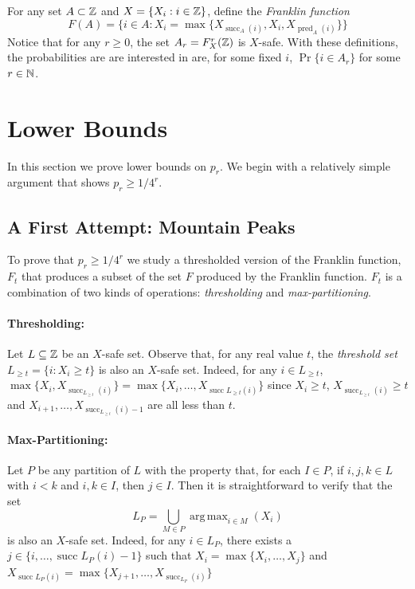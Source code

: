 \documentclass{patmorin}
\DeclareMathOperator*{\argmax}{arg\,max}
\DeclareMathOperator{\cw}{succ}
\DeclareMathOperator{\ccw}{pred}
\begin{document}
For any set $A\subset\mathbb{Z}$ and $X=\{X_i:i\in \mathbb{Z}\}$, define the
\emph{Franklin function}
\[
   F(A) = \{ i\in A : X_{i} = \max\{X_{\cw_A(i)},X_i,X_{\ccw_A(i)}\} \}
\]
Notice that for any $r\ge 0$, the set $A_r=F^r_X(\mathbb{Z})$ is $X$-safe.
With these definitions, the probabilities are are interested in are,
for some fixed $i$, $\Pr\{i\in A_r\}$ for some $r\in\mathbb{N}$.

\section{Lower Bounds}

In this section we prove lower bounds on $p_r$. We begin with a relatively simple argument that shows $p_r \ge 1/4^r$.  

\subsection{A First Attempt: Mountain Peaks}

To prove that $p_r \ge 1/4^r$ we study a
thresholded version of the Franklin function, $F_t$ that produces a
subset of the set $F$ produced by the Franklin function. $F_t$ is a
combination of two kinds of operations: \emph{thresholding} and \emph{max-partitioning}.

\paragraph{Thresholding:}
Let $L\subseteq\mathbb{Z}$ be an $X$-safe set.  Observe that, for any real
value $t$, the \emph{threshold set} $L_{\ge t}=\{i:X_i\ge t\}$ is also an
$X$-safe set. Indeed, for any $i\in L_{\ge t}$, $\max\{X_i,X_{\cw_{L_{\ge t}}(i)}\} = \max\{X_i,\ldots,X_{\cw{L_{\ge t}}(i)}\}$ since $X_i\ge t$, $X_{\cw_{L_{\ge t}}(i)}\ge t$ and $X_{i+1},\ldots,X_{\cw_{L_{\ge t}}(i)-1}$ are all less than $t$.

\paragraph{Max-Partitioning:}
Let $P$ be any partition of $L$ with the property that, for each $I\in
P$, if $i,j,k\in L$ with $i < k$ and $i,k\in I$, then $j\in I$. Then it
is straightforward to verify that the set
\[
     L_{P} = \bigcup_{M\in P} \argmax_{i\in M}(X_i)
\]
is also an $X$-safe set. Indeed, for any $i\in L_{P}$, there exists a $j\in\{i,\ldots,\cw{L_P}(i)-1\}$ such that $X_i=\max\{X_i,\ldots,X_j\}$ and $X_{\cw{L_P}(i)}=\max\{X_{j+1},\ldots,X_{\cw_{L_P}(i)}\}$
\end{document}
